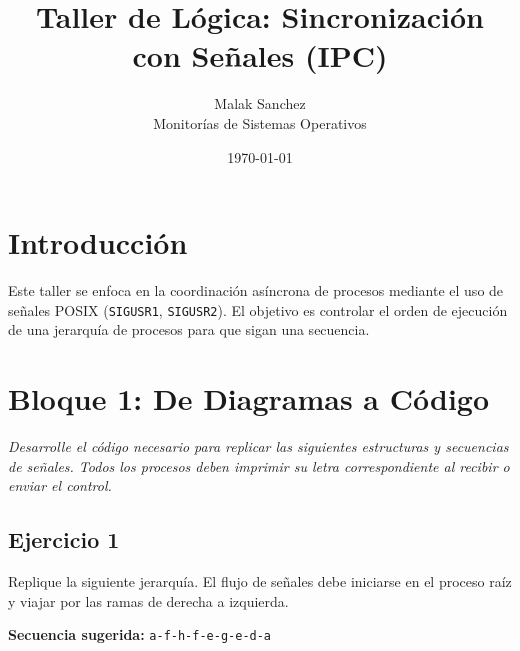 \documentclass[12pt,a4paper]{article}
\title{\textbf{Taller de Lógica: Sincronización con Señales (IPC)}}
\author{Malak Sanchez \\ \small Monitorías de Sistemas Operativos}
\date{\today}
\begin{document}
\maketitle

\section*{Introducción}
Este taller se enfoca en la coordinación asíncrona de procesos mediante el uso de señales POSIX (\texttt{SIGUSR1}, \texttt{SIGUSR2}). El objetivo es controlar el orden de ejecución de una jerarquía de procesos para que sigan una secuencia.

\section*{Bloque 1: De Diagramas a Código}
\textit{Desarrolle el código necesario para replicar las siguientes estructuras y secuencias de señales. Todos los procesos deben imprimir su letra correspondiente al recibir o enviar el control.}

\subsection*{Ejercicio 1}
Replique la siguiente jerarquía. El flujo de señales debe iniciarse en el proceso raíz y viajar por las ramas de derecha a izquierda.

\textbf{Secuencia sugerida:} \texttt{a-f-h-f-e-g-e-d-a}

\begin{center}
\end{center}
\end{document}
